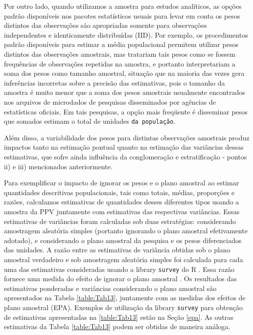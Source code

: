 \documentclass[]{book}
\numberwithin{example}{chapter}
\numberwithin{remark}{chapter}
\numberwithin{definition}{chapter}
\begin{document}
Por outro lado, quando utilizamos a amostra para estudos analíticos, as
opções padrão disponíveis nos pacotes estatísticos usuais para levar em
conta os pesos distintos das observações são apropriadas somente para
observações independentes e identicamente distribuídas (IID). Por
exemplo, os procedimentos padrão disponíveis para estimar a média
populacional permitem utilizar pesos distintos das observações
amostrais, mas tratariam tais pesos como se fossem frequências de
observações repetidas na amostra, e portanto interpretariam a soma dos
pesos como tamanho amostral, situação que na maioria das vezes gera
inferências incorretas sobre a precisão das estimativas, pois o tamanho
da amostra é muito menor que a soma dos pesos amostrais usualmente
encontrados nos arquivos de microdados de pesquisas disseminados por
agências de estatísticas oficiais. Em tais pesquisas, a opção mais
freqüente é disseminar pesos que somados estimam o total de unidades
\texttt{da\ população}.

Além disso, a variabilidade dos pesos para distintas observações
amostrais produz impactos tanto na estimação pontual quanto na estimação
das variâncias dessas estimativas, que sofre ainda influência da
conglomeração e estratificação - pontos ii) e iii) mencionados
anteriormente.

Para exemplificar o impacto de ignorar os pesos e o plano amostral ao
estimar quantidades descritivas populacionais, tais como totais, médias,
proporções e razões, calculamos estimativas de quantidades desses
diferentes tipos usando a amostra da PPV juntamente com estimativas das
respectivas variâncias. Essas estimativas de variâncias foram calculadas
sob duas estratégias: considerando amostragem aleatória simples
(portanto ignorando o plano amostral efetivamente adotado), e
considerando o plano amostral da pesquisa e os pesos diferenciados das
unidades. A razão entre as estimativas de variância obtidas sob o plano
amostral verdadeiro e sob amostragem aleatória simples foi calculada
para cada uma das estimativas consideradas usando a library
\texttt{survey} do R \citep{R-survey} . Essa razão fornece uma medida do
efeito de ignorar o plano amostral . Os resultados das estimativas
ponderadas e variâncias considerando o plano amostral são apresentados
na Tabela \ref{table:Tab13}, juntamente com as medidas dos efeitos de
plano amostral (EPA). Exemplos de utilização da library \texttt{survey}
para obtenção de estimativas apresentadas na \ref{table:Tab13} estão na
Seção \ref{epa}. As outras estimativas da Tabela \ref{table:Tab13} podem
ser obtidas de maneira análoga.
\end{document}
